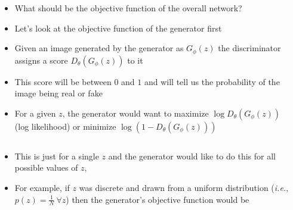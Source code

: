 {\begin{frame}
	\begin{columns}
		\begin{overlayarea}{\textwidth}{\textheight}
			\vspace*{10mm}
			\begin{center}
						
			\end{center}		
		\end{overlayarea}

		\begin{overlayarea}{\textwidth}{\textheight}
			\begin{itemize}[<+->]\justifying
				\item What should be the objective function of the overall network?
				\item Let's look at the objective function of the generator first 
				\item Given an image generated by the generator as $G_\phi(z)$ the discriminator assigns a score $D_\theta(G_\phi(z))$ to it 
				\item This score will be between $0$ and $1$ and will tell us the probability of the image being real or fake 
				\item For a given $z$, the generator would want to maximize  $\log D_\theta(G_\phi(z))$ (log likelihood) or minimize $\log (1 - D_\theta(G_\phi(z)))$
			\end{itemize}
			\vspace{10mm}
			
		\end{overlayarea}
	\end{columns}
\end{frame}

\begin{frame}
	\begin{columns}
		\column{0.45\textwidth}
		\begin{overlayarea}{\textwidth}{\textheight}
			\vspace*{10mm}
			\begin{center}
						
			\end{center}		
		\end{overlayarea}

		\column{0.55\textwidth}
		\begin{overlayarea}{\textwidth}{\textheight}
			\begin{itemize}[<+->]\justifying
				\item This is just for a single $z$ and the generator would like to do this for all possible values of $z$,
				\item For example, if $z$ was discrete and drawn from a uniform distribution (\textit{i.e.}, $p(z) = \frac{1}{N} ~ \forall z$) then the generator's objective function would be 


\end{itemize}
\end{overlayarea}
\end{columns}
\end{frame}}
